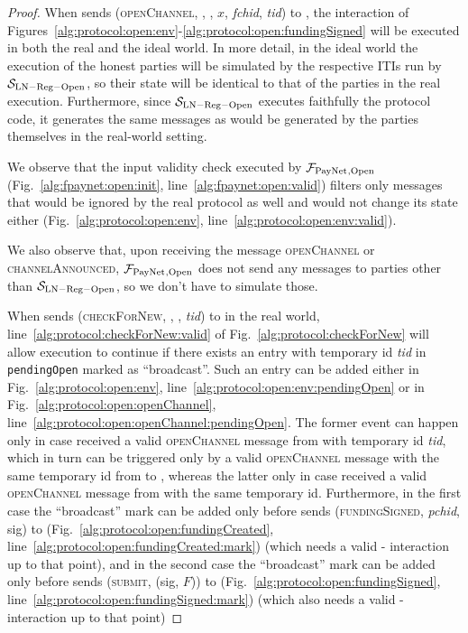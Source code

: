\begin{proof}
  When \environment{} sends (\textsc{openChannel}, \alice, \bob, $x$,
  \textit{fchid}, \textit{tid}) to \alice, the interaction of
  Figures~\ref{alg:protocol:open:env}-\ref{alg:protocol:open:fundingSigned}
  will be executed in both the real and the ideal world. In more detail, in
  the ideal world the execution of the honest parties will be simulated by the
  respective ITIs run by $\mathcal{S}_{\mathrm{LN - Reg - Open}}$, so their
  state will be identical to that of the parties in the real execution.
  Furthermore, since $\mathcal{S}_{\mathrm{LN - Reg - Open}}$ executes
  faithfully the protocol code, it generates the same messages as would be
  generated by the parties themselves in the real-world setting.

  We observe that the input validity check executed by $\mathcal{F}_{\mathrm{PayNet}}{}_{\mathrm{,
  Open}}$ (Fig.~\ref{alg:fpaynet:open:init}, line~\ref{alg:fpaynet:open:valid})
  filters only messages that would be ignored by the real protocol as well and
  would not change its state either (Fig.~\ref{alg:protocol:open:env},
  line~\ref{alg:protocol:open:env:valid}).

  We also observe that, upon receiving the message \textsc{openChannel} or
  \textsc{channelAnnounced}, $\mathcal{F}_{\mathrm{PayNet}}{}_{\mathrm{, Open}}$ does not send any
  messages to parties other than $\mathcal{S}_{\mathrm{LN - Reg - Open}}$, so we
  don't have to simulate those.

  When \environment{} sends (\textsc{checkForNew}, \alice, \bob, \textit{tid}) to
  \alice{} in the real world, line~\ref{alg:protocol:checkForNew:valid} of
  Fig.~\ref{alg:protocol:checkForNew} will allow execution to continue if there
  exists an entry with temporary id \textit{tid} in \texttt{pendingOpen}
  marked as ``broadcast''. Such an entry can be added either in
  Fig.~\ref{alg:protocol:open:env},
  line~\ref{alg:protocol:open:env:pendingOpen} or in
  Fig.~\ref{alg:protocol:open:openChannel},
  line~\ref{alg:protocol:open:openChannel:pendingOpen}. The former event can
  happen only in case \alice{} received a valid \textsc{openChannel} message
  from \bob{} with temporary id \textit{tid}, which in turn can be triggered
  only by a valid \textsc{openChannel} message with the same temporary id from
  \environment{} to \bob{}, whereas the latter only in case \alice{} received
  a valid \textsc{openChannel} message from \environment{} with the same
  temporary id. Furthermore, in the first case the ``broadcast'' mark can be
  added only before \alice{} sends (\textsc{fundingSigned}, \textit{pchid},
  sig) to \bob{} (Fig.~\ref{alg:protocol:open:fundingCreated},
  line~\ref{alg:protocol:open:fundingCreated:mark}) (which needs a valid
  \alice-\bob{} interaction up to that point), and in the second case the
  ``broadcast'' mark can be added only before \alice{} sends (\textsc{submit},
  (sig, $F$)) to \ledger{} (Fig.~\ref{alg:protocol:open:fundingSigned},
  line~\ref{alg:protocol:open:fundingSigned:mark}) (which also needs a valid
  \alice-\bob{} interaction up to that point)


\end{proof}
